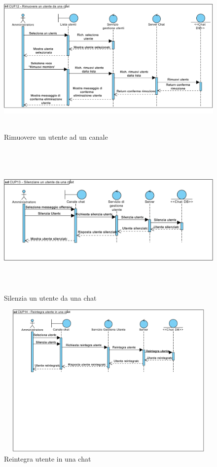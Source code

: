 \begin{figure}
	\centering
	\includegraphics[height=3in,width=5in]{imgs/gruppo6/sequence/CUP12_rimuovere_un_utente_da_un_canale.pdf}
	\caption{Rimuovere un utente ad un canale}
	\label{fig:prova}
\end{figure}

\begin{figure}
	\centering
	\includegraphics[height=3in,width=5in]{imgs/gruppo6/sequence/CUP13_silenzia_un_utente_da_una_chat.pdf}
	\caption{Silenzia un utente da una chat}
	\label{fig:prova}
\end{figure}

\begin{figure}
	\centering
	\includegraphics[height=3in,width=5in]{imgs/gruppo6/sequence/CUP14_reintegra_utente_in_una_chat.pdf}
	\caption{Reintegra utente in una chat}
	\label{fig:prova}
\end{figure}

